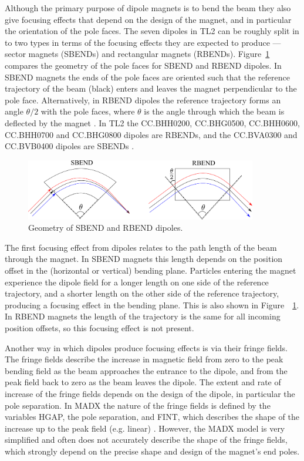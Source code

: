Although the primary purpose of dipole magnets is to bend the beam they also give focusing effects that depend on the design of the magnet, and in particular the orientation of the pole faces. The seven dipoles in TL2 can be roughly split in to two types in terms of the focusing effects they are expected to produce --- sector magnets (SBENDs) and rectangular magnets (RBENDs). Figure~\ref{f:sbendrbend} compares the geometry of the pole faces for SBEND and RBEND dipoles. In SBEND magnets the ends of the pole faces are oriented such that the reference trajectory of the beam (black) enters and leaves the magnet perpendicular to the pole face. Alternatively, in RBEND dipoles 
the reference trajectory forms an angle \(\theta/2\) with the pole faces, where \(\theta\) is the angle through which the beam is deflected by the magnet \cite{wiedemann}. In TL2 the CC.BHH0200, CC.BHG0500, CC.BHH0600, CC.BHH0700 and CC.BHG0800 dipoles are RBENDs, and the CC.BVA0300 and CC.BVB0400 dipoles are SBENDs \cite{tl2Magnets}.

\begin{figure}
  \centering
  \includegraphics[width=0.9\textwidth]{Figures/optics/sbendrbend}
  \caption{Geometry of SBEND and RBEND dipoles.}
  \label{f:sbendrbend}
\end{figure}

The first focusing effect from dipoles relates to the path length of the beam through the magnet. In SBEND magnets this length depends on the position offset in the (horizontal or vertical) bending plane. Particles entering the magnet experience the dipole field for a longer length on one side of the reference trajectory, and a shorter length on the other side of the reference trajectory, producing a focusing effect in the bending plane. This is also shown in Figure~~\ref{f:sbendrbend}. In RBEND magnets the length of the trajectory is the same for all incoming position offsets, so this focusing effect is not present.

Another way in which dipoles produce focusing effects is via their fringe fields. The fringe fields describe the increase in magnetic field from zero to the peak bending field as the beam approaches the entrance to the dipole, and from the peak field back to zero as the beam leaves the dipole. The extent and rate of increase of the fringe fields depends on the design of the dipole, in particular the pole separation. In MADX the nature of the fringe fields is defined by the variables HGAP, the pole separation, and FINT, which describes the shape of the increase up to the peak field (e.g. linear) \cite{madx}. However, the MADX model is very simplified and often does not accurately describe the shape of the fringe fields, which strongly depend on the precise shape and design of the magnet's end poles.

